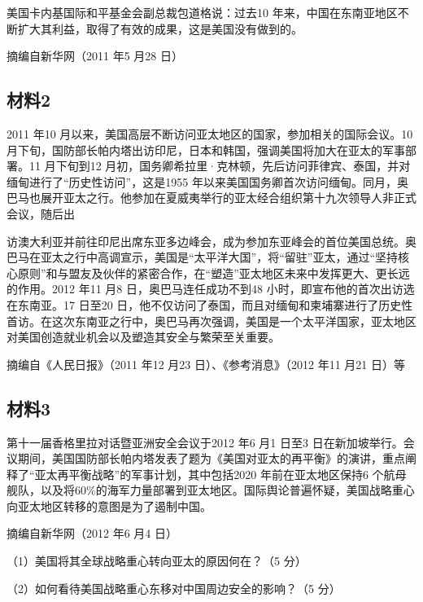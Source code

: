 \documentclass[UTF8,11pt]{ctexart}
\begin{document}
美国卡内基国际和平基金会副总裁包道格说：过去10 年来，中国在东南亚地区不断扩大其利益，取得了有效的成果，这是美国没有做到的。

摘编自新华网（2011 年5 月28 日）

\subsection*{材料2}

2011 年10 月以来，美国高层不断访问亚太地区的国家，参加相关的国际会议。10 月下旬，国防部长帕内塔出访印尼，日本和韩国，强调美国将加大在亚太的军事部署。11 月下旬到12 月初，国务卿希拉里·克林顿，先后访问菲律宾、泰国，并对缅甸进行了“历史性访问”，这是1955 年以来美国国务卿首次访问缅甸。同月，奥巴马也展开亚太之行。他参加在夏威夷举行的亚太经合组织第十九次领导人非正式会议，随后出


访澳大利亚并前往印尼出席东亚多边峰会，成为参加东亚峰会的首位美国总统。奥巴马在亚太之行中高调宣示，美国是“太平洋大国”，将“留驻”亚太，通过“坚持核心原则”和与盟友及伙伴的紧密合作，在“塑造”亚太地区未来中发挥更大、更长远的作用。2012 年11 月8 日，奥巴马连任成功不到48 小时，即宣布他的首次出访选在东南亚。17 日至20 日，他不仅访问了泰国，而且对缅甸和柬埔寨进行了历史性首访。在这次东南亚之行中，奥巴马再次强调，美国是一个太平洋国家，亚太地区对美国创造就业机会以及塑造其安全与繁荣至关重要。

摘编自《人民日报》（2011 年12 月23 日）、《参考消息》（2012 年11 月21 日）等

\subsection*{材料3}

第十一届香格里拉对话暨亚洲安全会议于2012 年6 月1 日至3 日在新加坡举行。会议期间，美国国防部长帕内塔发表了题为《美国对亚太的再平衡》的演讲，重点阐释了“亚太再平衡战略”的军事计划，其中包括2020 年前在亚太地区保持6 个航母舰队，以及将60\%的海军力量部署到亚太地区。国际舆论普遍怀疑，美国战略重心向亚太地区转移的意图是为了遏制中国。

摘编自新华网（2012 年6 月4 日）

（1）美国将其全球战略重心转向亚太的原因何在？（5 分）


（2）如何看待美国战略重心东移对中国周边安全的影响？（5 分）
\end{document}
